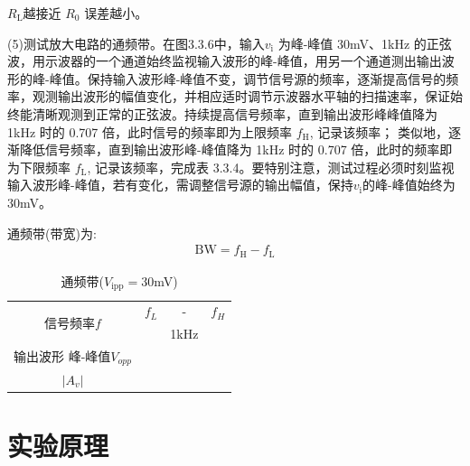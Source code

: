 \documentclass[a4paper,11pt,UTF8]{article}
\numberwithin{equation}{subsection}
\begin{document}
$R_{\mathrm{L}}$越接近 $R_{0}$ 误差越小。

(5)测试放大电路的通频带。在图3.3.6中，输入$v_\mathrm{i}$ 为峰-峰值 30mV、1kHz 的正弦波，用示波器的一个通道始终监视输入波形的峰-峰值，用另一个通道测出输出波形的峰-峰值。保持输入波形峰-峰值不变，调节信号源的频率，逐渐提高信号的频率，观测输出波形的幅值变化，并相应适时调节示波器水平轴的扫描速率，保证始终能清晰观测到正常的正弦波。持续提高信号频率，直到输出波形峰峰值降为 1kHz 时的 0.707 倍，此时信号的频率即为上限频率 $f_\mathrm{H}$, 记录该频率； 类似地，逐渐降低信号频率，直到输出波形峰-峰值降为 1kHz 时的 0.707 倍，此时的频率即为下限频率 $f_\mathrm{L}$, 记录该频率，完成表 3.3.4。要特别注意，测试过程必须时刻监视输入波形峰-峰值，若有变化，需调整信号源的输出幅值，保持$v_\mathrm{i}$的峰-峰值始终为 30mV。

通频带(带宽)为: 
\begin{align}\mathrm{BW}=f_{\mathrm{H}}-f_{\mathrm{L}}\end{align}
\begin{table}[H]
	\centering
	\begin{tabular}{|c|c|c|c|}
		\hline
		\multirow{2}{*}{信号频率$f$} & $f_L$ & - & $f_H$\\
		\cline{2-4}
		&&1kHz&\\	
		\hline
		\shortstack{输出波形\\峰-峰值$V_{opp}$}&&&\\
		\hline
		$|A_v|$&&&\\
		\hline	
	\end{tabular}
	\caption{通频带($V_{\mathrm{ipp}}=30$mV)}
\end{table}
\section{实验原理}
\end{document}
